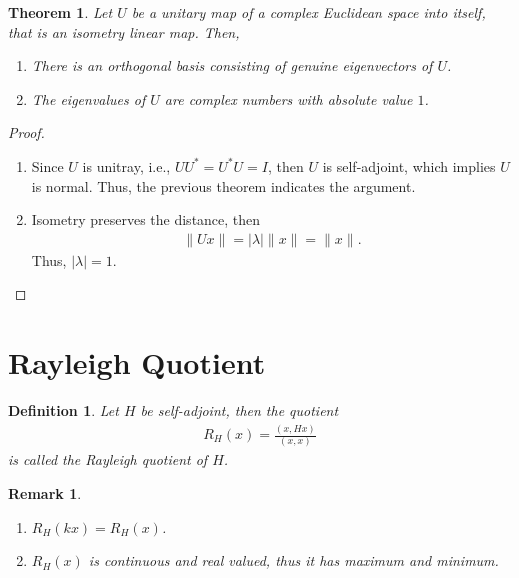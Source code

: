 \documentclass[11pt]{book}
\newtheorem{definition}{Definition}[section]
\newtheorem{theorem}{Theorem}[section]
\newtheorem{remark}{Remark}[section]
\theoremstyle{definition}
\numberwithin{equation}{subsection}
\begin{document}
\medskip

\begin{theorem}
Let $U$ be a unitary map of a complex Euclidean space into itself, that is an isometry linear map. Then,
\begin{enumerate}[label=(\roman*)]
    \item There is an orthogonal basis consisting of genuine eigenvectors of $U$.
    \item The eigenvalues of $U$ are complex numbers with absolute value $1$.
\end{enumerate}
\end{theorem}
\begin{proof}
~\begin{enumerate}[label=(\roman*)]
    \item Since $U$ is unitray, i.e., $UU^* = U^*U = I$, then $U$ is self-adjoint, which implies $U$ is normal. Thus,  the previous theorem indicates the argument.
    \item Isometry preserves the distance, then 
    \begin{align*}
        \|Ux\| = |\lambda| \|x\| = \|x\|.
    \end{align*}
    Thus, $|\lambda| = 1$.
\end{enumerate}
\end{proof}

\medskip

\section{Rayleigh Quotient}

\begin{definition}
Let $H$ be self-adjoint, then the quotient
\begin{align*}
    R_H(x) = \frac{(x,Hx)}{(x,x)}
\end{align*}
is called the Rayleigh quotient of $H$.
\end{definition}

\begin{remark}
~\begin{enumerate}[label=(\arabic*)]
    \item $R_H(kx) = R_H(x)$.
    \item $R_H(x)$ is continuous and real valued, thus it has maximum and minimum.
\end{enumerate}
\end{remark}

\medskip
\end{document}
